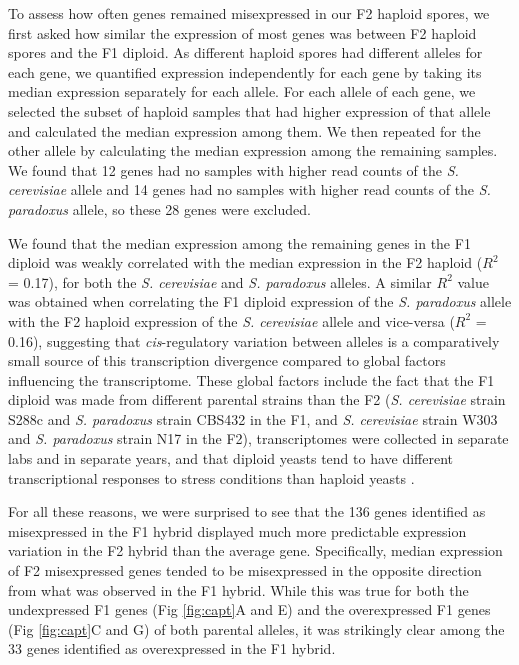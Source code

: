 To assess how often genes remained misexpressed in our F2 haploid spores, we first asked how similar the expression of most genes was between F2 haploid spores and the F1 diploid. As different haploid spores had different alleles for each gene, we quantified expression independently for each gene by taking its median expression separately for each allele. For each allele of each gene, we selected the subset of haploid samples that had higher expression of that allele and calculated the median expression among them. We then repeated for the other allele by calculating the median expression among the remaining samples. We found that 12 genes had no samples with higher read counts of the \textit{S. cerevisiae} allele and 14 genes had no samples with higher read counts of the \textit{S. paradoxus} allele, so these 28 genes were excluded.

We found that the median expression among the remaining genes in the F1 diploid was weakly correlated with the median expression in the F2 haploid ($R^2$ = 0.17), for both the \textit{S. cerevisiae} and \textit{S. paradoxus} alleles. A similar $R^2$ value was obtained when correlating the F1 diploid expression of the \textit{S. paradoxus} allele with the F2 haploid expression of the \textit{S. cerevisiae} allele and vice-versa ($R^2$ = 0.16), suggesting that \textit{cis}-regulatory variation between alleles is a comparatively small source of this transcription divergence compared to global factors influencing the transcriptome. These global factors include the fact that the F1 diploid was made from different parental strains than the F2 (\textit{S. cerevisiae} strain S288c and \textit{S. paradoxus} strain CBS432 in the F1, and \textit{S. cerevisiae} strain W303 and \textit{S. paradoxus} strain N17 in the F2), transcriptomes were collected in separate labs and in separate years, and that diploid yeasts tend to have different transcriptional responses to stress conditions than haploid yeasts \cite{Li2010, Xie2020, Park2024}.

For all these reasons, we were surprised to see that the 136 genes identified as misexpressed in the F1 hybrid displayed much more predictable expression variation in the F2 hybrid than the average gene. Specifically, median expression of F2 misexpressed genes tended to be misexpressed in the opposite direction from what was observed in the F1 hybrid. While this was true for both the undexpressed F1 genes (Fig \ref{fig:capt}A and E) and the overexpressed F1 genes (Fig \ref{fig:capt}C and G) of both parental alleles, it was strikingly clear among the 33 genes identified as overexpressed in the F1 hybrid.

